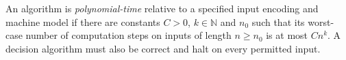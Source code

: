 
An algorithm is \emph{polynomial-time} relative to a specified input encoding and machine model if there are constants $C>0$, $k\in\mathbb N$ and $n_0$ such that its worst-case number of computation steps on inputs of length $n\ge n_0$ is at most $Cn^k$. A decision algorithm must also be correct and halt on every permitted input.
